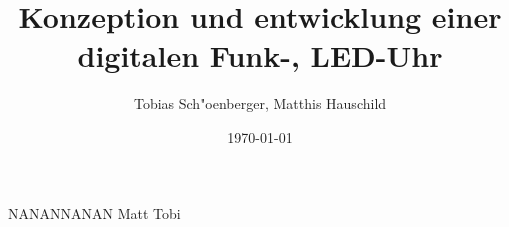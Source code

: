 \documentclass[16pt,a4paper]{article}
\title{Konzeption und entwicklung einer digitalen Funk-, LED-Uhr}
\author{Tobias Sch"oenberger, Matthis Hauschild}
\date{\today}
\begin{document}
\maketitle

NANANNANAN Matt\cite{cite1} Tobi\cite{cite2}



\end{document}
